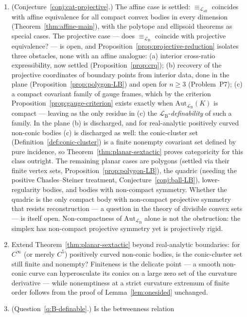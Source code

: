 \documentclass[11pt]{amsart}
\theoremstyle{definition}
\newcommand{\Laff}{\mathcal{L}_{\mathrm{aff}}}
\newcommand{\LB}{\mathcal{L}_{\mathrm{B}}}
\begin{document}
\begin{enumerate}[label=\textbf{P\arabic*.},leftmargin=2.6em]
\item (Conjecture~\ref{conj:cat-projective}.) The affine case is settled:
$\equiv_{\Laff}$ coincides with affine equivalence for all compact convex
bodies in every dimension (Theorem~\ref{thm:affine-main}), with the polytope
and ellipsoid theorems as special cases. The projective case --- does
$\equiv_{\LB}$ coincide with projective equivalence? --- is open, and
Proposition~\ref{prop:projective-reduction} isolates three obstacles, none with
an affine analogue: (a) interior cross-ratio expressibility, now settled
(Proposition~\ref{prop:crq}); (b) recovery of the projective
coordinates of boundary points from interior data, done in the plane
(Proposition~\ref{prop:polygon-LB}) and open for $n\ge3$ (Problem~P7); (c) a
compact covariant family of gauge frames, which by the criterion
Proposition~\ref{prop:gauge-criterion} exists exactly when
$\mathrm{Aut}_{\LB}(K)$ is compact --- leaving as the only residue in (c) the
$\LB$-\emph{definability} of such a family. In the plane (b) is discharged, and
for real-analytic positively curved non-conic bodies (c) is discharged as
well: the conic-cluster set (Definition~\ref{def:conic-cluster}) is a finite
nonempty covariant set defined by pure incidence, so
Theorem~\ref{thm:planar-sextactic} proves categoricity for this class
outright. The remaining planar cases are polygons (settled
via their finite vertex sets, Proposition~\ref{prop:polygon-LB}), the quadric (needing the positive
Chasles--Steiner treatment, Conjecture~\ref{conj:ball-LB}), lower-regularity
bodies, and bodies with non-compact symmetry. Whether the quadric is the
only compact body with non-compact projective symmetry that resists
reconstruction --- a question in the theory of divisible convex sets --- is
itself open. Non-compactness of
$\mathrm{Aut}_{\LB}$ alone is not the obstruction: the simplex has non-compact
projective symmetry yet is projectively rigid.
\item Extend Theorem~\ref{thm:planar-sextactic} beyond real-analytic
boundaries: for $C^\infty$ (or merely $C^5$) positively curved non-conic
bodies, is the conic-cluster set still finite and nonempty? Finiteness is the
delicate point --- a smooth non-conic curve can hyperosculate its conics on a
large zero set of the curvature derivative --- while nonemptiness at a strict
curvature extremum of finite order follows from the proof of
Lemma~\ref{lem:onesided} unchanged.
\item (Question~\ref{q:B-definable}.) Is the betweenness relation

\end{enumerate}
\end{document}
